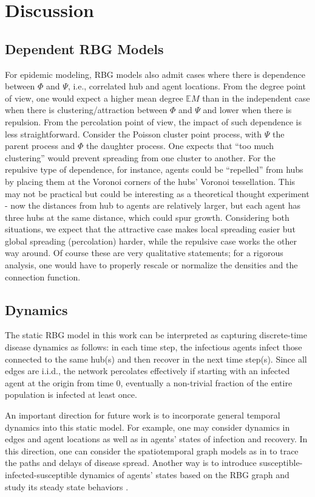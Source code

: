 \section{Discussion}
\subsection{Dependent RBG Models}
For epidemic modeling, RBG models also admit cases where there is dependence between $\Phi$ and $\Psi$, i.e., correlated hub and agent locations. From the degree point of view, one would expect a higher mean degree $\mathbb{E}M$ than in the independent case when there is clustering/attraction between $\Phi$ and $\Psi$ and lower when there is repulsion. From the percolation point of view, the impact of such dependence is less straightforward.  
 Consider the Poisson cluster point process, with $\Psi$ the parent process and $\Phi$ the daughter process. One expects that ``too much clustering'' would prevent spreading from one cluster to another. For the repulsive type of dependence, for instance, agents could be “repelled” from hubs by placing them at the Voronoi corners of the hubs' Voronoi tessellation.  This may not be practical but could be interesting as a theoretical thought experiment - now the distances from hub to agents are relatively larger, but each agent has three hubs at the same distance, which could spur growth. Considering both situations, we expect that the attractive case makes local spreading easier but global spreading (percolation) harder, while the repulsive case works the other way around. Of course these are very qualitative statements; for a rigorous analysis, one would have to properly rescale or normalize the densities and the connection function. 
\subsection{Dynamics}
The static RBG model in this work can be interpreted as capturing discrete-time disease dynamics as follows: in each
time step, the infectious agents infect those connected to the same hub(s) and
then recover in the next time step(s). Since all edges are i.i.d., the network percolates
effectively if starting with an infected agent at the origin from time 0, eventually a
non-trivial fraction of the entire population is infected at least once.  

An important direction for future work is to incorporate general temporal dynamics into this static model. For example, one may consider dynamics in edges and agent locations as well as in agents' states of infection and recovery. In this direction, one can consider the spatiotemporal graph models as in \cite[Chapter 11]{haenggi2012stochastic} to trace the paths and delays of disease spread. Another way is to introduce susceptible-infected-susceptible dynamics of agents' states based on the RBG graph and study its steady state behaviors \cite[Chapter 7]{liggett1985interacting}.

